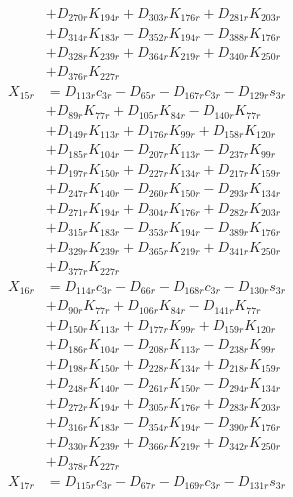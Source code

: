 \begin{multicols}{2}
\begin{align}
&+ D_{270r}K_{194r} + D_{303r}K_{176r} + D_{281r}K_{203r}  \nonumber \\
&+ D_{314r}K_{183r} - D_{352r}K_{194r} - D_{388r}K_{176r}  \nonumber \\
&+ D_{328r}K_{239r} + D_{364r}K_{219r} + D_{340r}K_{250r}  \nonumber \\
&+ D_{376r}K_{227r} \nonumber \\
X_{15r} &= D_{113r}c_{3r} - D_{65r} - D_{167r}c_{3r} - D_{129r}s_{3r}  \nonumber \\
&+ D_{89r}K_{77r} + D_{105r}K_{84r} - D_{140r}K_{77r}  \nonumber \\
&+ D_{149r}K_{113r} + D_{176r}K_{99r} + D_{158r}K_{120r}  \nonumber \\
&+ D_{185r}K_{104r} - D_{207r}K_{113r} - D_{237r}K_{99r}  \nonumber \\
&+ D_{197r}K_{150r} + D_{227r}K_{134r} + D_{217r}K_{159r}  \nonumber \\
&+ D_{247r}K_{140r} - D_{260r}K_{150r} - D_{293r}K_{134r}  \nonumber \\
&+ D_{271r}K_{194r} + D_{304r}K_{176r} + D_{282r}K_{203r}  \nonumber \\
&+ D_{315r}K_{183r} - D_{353r}K_{194r} - D_{389r}K_{176r}  \nonumber \\
&+ D_{329r}K_{239r} + D_{365r}K_{219r} + D_{341r}K_{250r}  \nonumber \\
&+ D_{377r}K_{227r} \nonumber \\
X_{16r} &= D_{114r}c_{3r} - D_{66r} - D_{168r}c_{3r} - D_{130r}s_{3r}  \nonumber \\
&+ D_{90r}K_{77r} + D_{106r}K_{84r} - D_{141r}K_{77r}  \nonumber \\
&+ D_{150r}K_{113r} + D_{177r}K_{99r} + D_{159r}K_{120r}  \nonumber \\
&+ D_{186r}K_{104r} - D_{208r}K_{113r} - D_{238r}K_{99r}  \nonumber \\
&+ D_{198r}K_{150r} + D_{228r}K_{134r} + D_{218r}K_{159r}  \nonumber \\
&+ D_{248r}K_{140r} - D_{261r}K_{150r} - D_{294r}K_{134r}  \nonumber \\
&+ D_{272r}K_{194r} + D_{305r}K_{176r} + D_{283r}K_{203r}  \nonumber \\
&+ D_{316r}K_{183r} - D_{354r}K_{194r} - D_{390r}K_{176r}  \nonumber \\
&+ D_{330r}K_{239r} + D_{366r}K_{219r} + D_{342r}K_{250r}  \nonumber \\
&+ D_{378r}K_{227r} \nonumber \\
X_{17r} &= D_{115r}c_{3r} - D_{67r} - D_{169r}c_{3r} - D_{131r}s_{3r}  \nonumber \\

\end{align}
\end{multicols}
